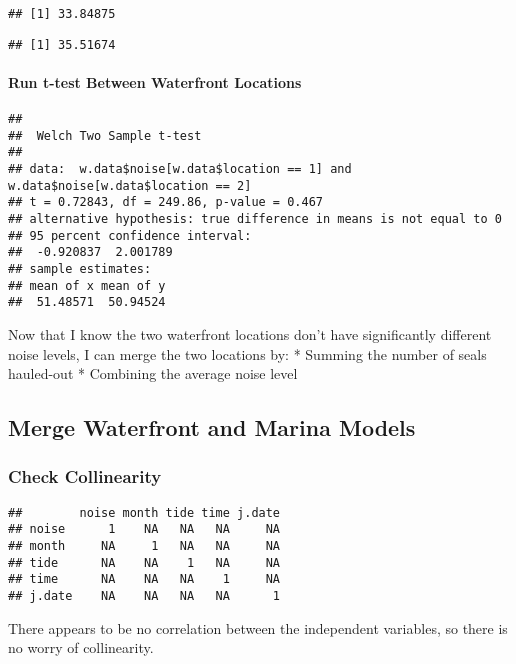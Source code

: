 \documentclass[
]{article}
\newenvironment{Shaded}{\begin{snugshade}}{\end{snugshade}}
\newcommand{\CommentTok}[1]{\textcolor[rgb]{0.56,0.35,0.01}{\textit{#1}}}
\newcommand{\DecValTok}[1]{\textcolor[rgb]{0.00,0.00,0.81}{#1}}
\newcommand{\FunctionTok}[1]{\textcolor[rgb]{0.00,0.00,0.00}{#1}}
\newcommand{\NormalTok}[1]{#1}
\newcommand{\SpecialCharTok}[1]{\textcolor[rgb]{0.00,0.00,0.00}{#1}}
\begin{document}
\begin{verbatim}
## [1] 33.84875
\end{verbatim}

\begin{Shaded}
\end{Shaded}

\begin{verbatim}
## [1] 35.51674
\end{verbatim}

\hypertarget{run-t-test-between-waterfront-locations}{%
\paragraph{Run t-test Between Waterfront
Locations}\label{run-t-test-between-waterfront-locations}}

\begin{verbatim}
## 
##  Welch Two Sample t-test
## 
## data:  w.data$noise[w.data$location == 1] and w.data$noise[w.data$location == 2]
## t = 0.72843, df = 249.86, p-value = 0.467
## alternative hypothesis: true difference in means is not equal to 0
## 95 percent confidence interval:
##  -0.920837  2.001789
## sample estimates:
## mean of x mean of y 
##  51.48571  50.94524
\end{verbatim}

Now that I know the two waterfront locations don't have significantly
different noise levels, I can merge the two locations by: * Summing the
number of seals hauled-out * Combining the average noise level

\hypertarget{merge-waterfront-and-marina-models}{%
\subsection{Merge Waterfront and Marina
Models}\label{merge-waterfront-and-marina-models}}

\hypertarget{check-collinearity}{%
\subsubsection{Check Collinearity}\label{check-collinearity}}

\begin{verbatim}
##        noise month tide time j.date
## noise      1    NA   NA   NA     NA
## month     NA     1   NA   NA     NA
## tide      NA    NA    1   NA     NA
## time      NA    NA   NA    1     NA
## j.date    NA    NA   NA   NA      1
\end{verbatim}

There appears to be no correlation between the independent variables, so
there is no worry of collinearity.
\end{document}
